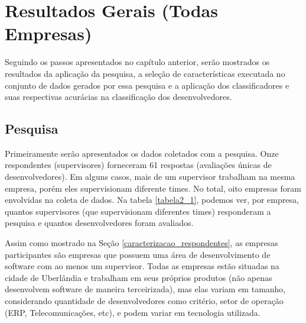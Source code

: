 \chapter[Resultados Gerais]{Resultados Gerais (Todas Empresas)}

Seguindo os passos apresentados no capítulo anterior, serão mostrados os resultados da aplicação da pesquisa, a seleção de características executada no conjunto de dados gerados por essa pesquisa e a aplicação dos classificadores e suas respectivas acurácias na classificação dos desenvolvedores.

\section{Pesquisa}\label{secao4.2}
Primeiramente serão apresentados os dados coletados com a pesquisa. Onze respondentes (supervisores) forneceram 61 respostas (avaliações únicas de desenvolvedores). Em alguns casos, mais de um supervisor trabalham na mesma empresa, porém eles supervisionam diferente times. No total, oito empresas foram envolvidas na coleta de dados. Na tabela \ref{tabela2_1}, podemos ver, por empresa, quantos supervisores (que supervisionam diferentes times) responderam a pesquisa e quantos desenvolvedores foram avaliados.

Assim como mostrado na Seção \ref{caracterizacao_respondentes}, as empresas participantes são empresas que possuem uma área de desenvolvimento de software com ao menos um supervisor. Todas as empresas estão situadas na cidade de Uberlândia e trabalham em seus próprios produtos (não apenas desenvolvem software de maneira terceirizada), mas elas variam em tamanho, considerando quantidade de desenvolvedores como critério, setor de operação (ERP, Telecomunicações, etc), e podem variar em tecnologia utilizada.


